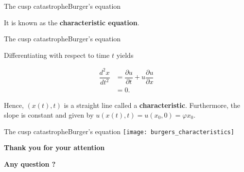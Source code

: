 \documentclass[aspectratio=169]{beamer}
\begin{document}
{\begin{frame}[t, c]{The cusp catastrophe}{\small Burger's equation}
    \medskip
    
    It is known as the \textbf{characteristic equation}.

    \vfill
  \end{frame}

  \begin{frame}[t, c]{The cusp catastrophe}{\small Burger's equation}
    \vfill
    \large

    Differentiating with respect to time $t$ yields
    
    \[
    \begin{aligned}
      \dfrac{d^2 x}{dt^2} & = \dfrac{\partial u}{\partial t} + u \dfrac{\partial u}{\partial x} \\
      & = 0.
    \end{aligned}
    \]
    
    Hence, $(x(t), t)$ is a straight line called a \textbf{characteristic}.
    Furthermore, the slope is constant and given by $u(x(t), t) = u(x_0, 0) = \varphi{x_0}$.

    \vfill
  \end{frame}

  \begin{frame}[t, c]{The cusp catastrophe}{\small Burger's equation}
    \centering
    \texttt{[image: burgers\_characteristics]}
  \end{frame}

}


{
  \begin{frame}[fragile]{}{}
    \vfill
    \flushright
    \Large
    \textbf{\color{black} Thank you for your attention}

    \large
    \textbf{\color{gray} Any question ?}
    \vfill
  \end{frame}
}
\end{document}
